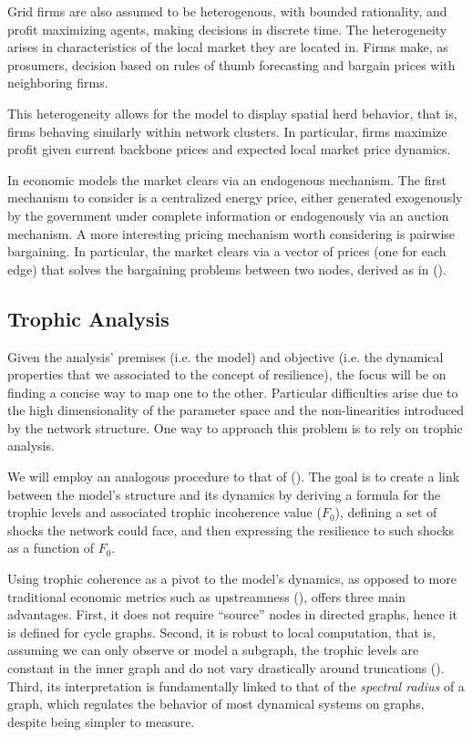 \documentclass[american]{scrartcl}
\begin{document}
Grid firms are also assumed to be heterogenous, with bounded rationality, and profit maximizing agents, making decisions in discrete time. The heterogeneity arises in characteristics of the local market they are located in. Firms make, as prosumers, decision based on rules of thumb forecasting and bargain prices with neighboring firms.

This heterogeneity allows for the model to display spatial herd behavior, that is, firms behaving similarly within network clusters. In particular, firms maximize profit given current backbone prices and expected local market price dynamics.

In economic models the market clears via an endogenous mechanism. The first mechanism to consider is a centralized energy price, either generated exogenously by the government under complete information or endogenously via an auction mechanism. A more interesting pricing mechanism worth considering is pairwise bargaining. In particular, the market clears via a vector of prices (one for each edge) that solves the bargaining problems between two nodes, derived as in \citeauthor{Bedayo2016} (\citeyear{Bedayo2016}).

\subsection{Trophic Analysis}

Given the analysis' premises (i.e. the model) and objective (i.e. the dynamical properties that we associated to the concept of resilience), the focus will be on finding a concise way to map one to the other. Particular difficulties arise due to the high dimensionality of the parameter space and the non-linearities introduced by the network structure. One way to approach this problem is to rely on trophic analysis.

We will employ an analogous procedure to that of \citeauthor{MacKay2020} (\citeyear[p.~19]{MacKay2020}). The goal is to create a link between the model's structure and its dynamics by deriving a formula for the trophic levels and associated trophic incoherence value ($F_0$), defining a set of shocks the network could face, and then expressing the resilience to such shocks as a function of $F_0$.

Using trophic coherence as a pivot to the model's dynamics, as opposed to more traditional economic metrics such as upstreamness (\cite{Antrs2012}), offers three main advantages. First, it does not require ``source'' nodes in directed graphs, hence it is defined for cycle graphs. Second, it is robust to local computation, that is, assuming we can only observe or model a subgraph, the trophic levels are constant in the inner graph and do not vary drastically around truncations (\cite[p.~19]{MacKay2020}). Third, its interpretation is fundamentally linked to that of the \textit{spectral radius} of a graph, which regulates the behavior of most dynamical systems on graphs, despite being simpler to measure.
\end{document}
